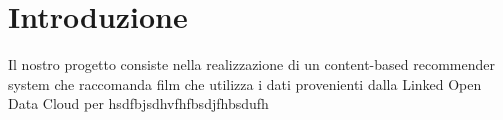 \section{Introduzione}
\label{introduction}

Il nostro progetto consiste nella realizzazione di un content-based recommender system che raccomanda film che utilizza i dati provenienti dalla Linked Open Data Cloud per hsdfbjsdhvfhfbsdjfhbsdufh
